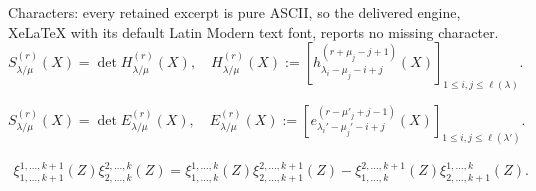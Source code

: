 \documentclass[10pt,a4paper]{amsart}
\begin{document}
Characters: every retained excerpt is pure ASCII, so the delivered engine, XeLaTeX with its default Latin Modern text font, reports no missing character.
\begin{equation}
\label{for:9thJT-nnsy} 
S^{(r)}_{\lambda/\mu}(X)
=\det H^{(r)}_{\lambda/\mu}(X),
\quad   
H^{(r)}_{\lambda/\mu}(X)
:=\left[h^{(r+\mu_j-j+1)}_{\lambda_i-\mu_j-i+j}(X)\right]_{1\le i,j\le \ell(\lambda)}.
\end{equation}

\begin{equation}
\label{for:9thDJT-nnsy} 
S^{(r)}_{\lambda/\mu}(X)
=\det E^{(r)}_{\lambda/\mu}(X),
\quad 
E^{(r)}_{\lambda/\mu}(X)
:=\left[e^{(r-\mu'_j+j-1)}_{\lambda_i'-\mu_j'-i+j}(X)\right]_{1\le i,j\le \ell(\lambda')}.
\end{equation}

\begin{align}
\label{for:Desnanot-Jacobi formula}
\xi^{1,\ldots,k+1}_{1,\ldots,k+1}(Z)
\xi^{2,\ldots,k}_{2,\ldots,k}(Z)
=
\xi^{1,\ldots,k}_{1,\ldots,k}(Z)
\xi^{2,\ldots,k+1}_{2,\ldots,k+1}(Z)
-
\xi^{2,\ldots,k+1}_{1,\ldots,k}(Z)
\xi^{1,\ldots,k}_{2,\ldots,k+1}(Z).
\end{align}
\end{document}
